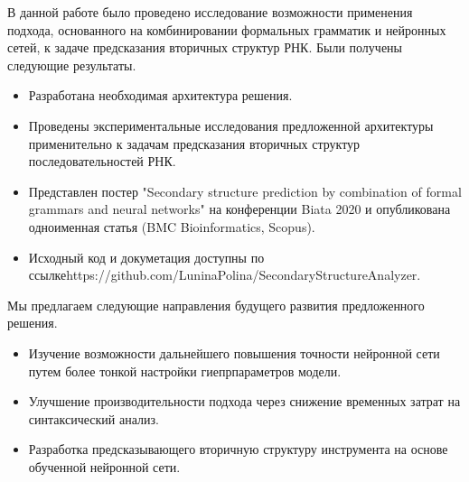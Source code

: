 В данной работе было проведено исследование возможности применения подхода, основанного на комбинировании формальных грамматик и нейронных сетей, к задаче предсказания вторичных структур РНК. Были получены следующие результаты.
\begin{itemize}
    \item Разработана необходимая архитектура решения.
    \item Проведены экспериментальные исследования предложенной архитектуры применительно к задачам предсказания вторичных структур последовательностей РНК.
    \item Представлен постер "Secondary structure prediction by combination
of formal grammars and neural networks" на конференции Biata 2020 и опубликована одноименная статья (BMC Bioinformatics, Scopus).
    \item Исходный код и докуметация доступны по ссылке\linebreak https://github.com/LuninaPolina/SecondaryStructureAnalyzer.
\end{itemize}

Мы предлагаем следующие направления будущего развития предложенного решения.
\begin{itemize}
    \item Изучение возможности дальнейшего повышения точности нейронной сети путем более тонкой настройки гиепрпараметров модели. 
    \item Улучшение производительности подхода через снижение временных затрат на синтаксический анализ.
    \item Разработка предсказывающего вторичную структуру инструмента на основе обученной нейронной сети.
\end{itemize}